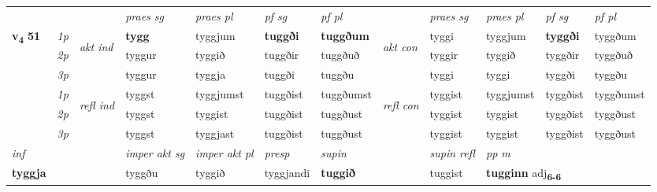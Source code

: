 \begin{longtable}[l]{X>{\footnotesize\itshape}llXXXXlXXXX}
 & &   & \textit{praes sg}  & \textit{praes pl}    & \textit{ pf sg} & \textit{pf pl} & & \textit{praes sg}  & \textit{praes pl}    & \textit{pf sg} & \textit{pf pl }  \\ \cmidrule{4-7} \cmidrule{9-12}
 \multirow{2}{*}{{{\textbf{v{\textsubscript{4}}} \Large{\textbf{51}}}}}  & 1p & \multirow{3}{*}{\begin{turn}{90}\textit{akt ind}\end{turn}} & \textbf{tygg} & tyggjum & \textbf{tuggði} & \textbf{tuggðum} & \multirow{3}{*}{\begin{turn}{90}\textit{akt con}\end{turn}} &tyggi & tyggjum & \textbf{tyggði} & tyggðum\\*
 & 2p &  &  tyggur  & tyggið & tuggðir & tuggðuð & & tyggir & tyggið & tyggðir & tyggðuð \\*
 & 3p &  & tyggur & tyggja & tuggði & tuggðu & & tyggi & tyggi& tyggði & tyggðu \\*
\cmidrule{4-7} \cmidrule{9-12}
 & 1p & \multirow{3}{*}{\begin{turn}{90}\textit{refl ind}\end{turn}}  & tyggst & tyggjumst & tuggðist & tuggðumst & \multirow{3}{*}{\begin{turn}{90}\textit{refl con}\end{turn}}  &tyggist & tyggjumst & tyggðist & tyggðumst \\*
 & 2p &  & tyggst & tyggist & tuggðist & tuggðust & &tyggist & tyggist & tyggðist & tyggðust \\*
 & 3p  & & tyggst & tyggjast & tuggðist & tuggðust & & tyggist & tyggist& tyggðist & tyggðust \\*
\cmidrule{4-7} \cmidrule{9-12}

   {\textit{inf}} & &  & \textit{imper akt sg} & \textit{imper akt pl}   & \textit{presp} & \textit{supin} && \textit{supin refl} & \textit{pp m} \\*
  {\textbf{tyggja}} & && tyggðu  & tyggið   & tyggjandi &  \textbf{tuggið} && tuggist & \multicolumn{2}{l}{\textbf{tugginn} adj\textbf{\textsubscript{6-6}}} \\*

\midrule


\end{longtable}
